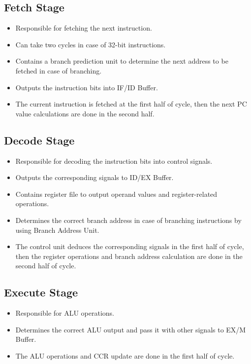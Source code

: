 \documentclass[12pt]{report}
\begin{document}
\subsection{Fetch Stage}
\begin{itemize}
    \item Responsible for fetching the next instruction.
    \item Can take two cycles in case of 32-bit instructions.
    \item Contains a branch prediction unit to determine the next address to be fetched in case of branching.
    \item Outputs the instruction bits into IF/ID Buffer.
    \item The current instruction is fetched at the first half of cycle, then the next PC value calculations are done in the second half.
\end{itemize}

\subsection{Decode Stage}
\begin{itemize}
    \item Responsible for decoding the instruction bits into control signals.
    \item Outputs the corresponding signals to ID/EX Buffer.
    \item Contains register file to output operand values and register-related operations.
    \item Determines the correct branch address in case of branching instructions by using Branch Address Unit.
    \item The control unit deduces the corresponding signals in the first half of cycle, then the register operations and branch address calculation are done in the second half of cycle.
\end{itemize}

\subsection{Execute Stage}
\begin{itemize}
    \item Responsible for ALU operations.
    \item Determines the correct ALU output and pass it with other signals to EX/M Buffer.
    \item The ALU operations and CCR update are done in the first half of cycle.
\end{itemize}
\end{document}
